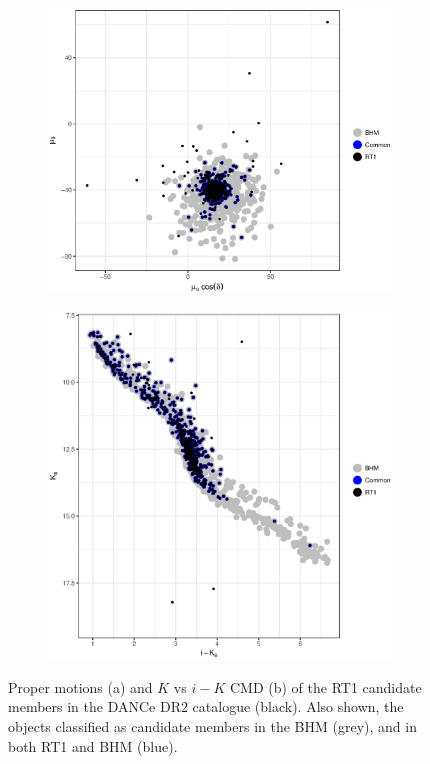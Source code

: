 \begin{figure}[ht!]
    \centering
    \begin{subfigure}[t]{0.45\textwidth}
    \centering
       \includegraphics[width=\textwidth]{background/Figures/RT1_pm.eps}
        \caption{}
    \end{subfigure}
    \begin{subfigure}[t]{0.45\textwidth}
    \centering
     \includegraphics[width=\textwidth]{background/Figures/RT1_ph.eps}
        \caption{}
    \end{subfigure}
\caption{Proper motions (a) and $K$ vs $i-K$ CMD (b) of the RT1 candidate members in the DANCe DR2 catalogue (black). Also shown, the objects classified as candidate members  in the BHM (grey), and in both RT1 and BHM (blue).}
\label{fig:RT1}
\end{figure}

